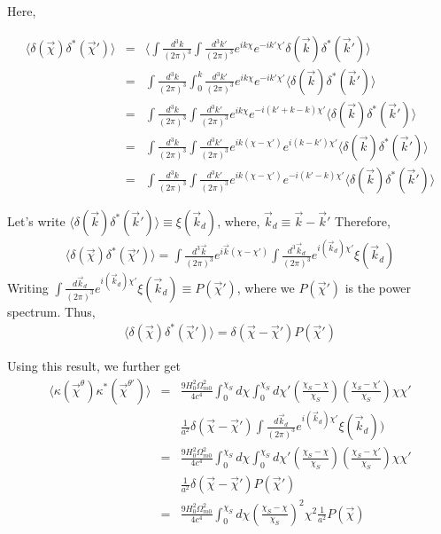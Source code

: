 \documentclass[12pt]{article}
\numberwithin{equation}{section}
\begin{document}
Here,

\begin{eqnarray}
\langle\delta(\vec{\chi}) \delta^*(\vec{\chi}') \rangle  
&=& \langle \int \frac{d^3k}{(2\pi)^3} \int \frac{d^3k'}{(2\pi)^3} e^{ik\chi} e^{-ik'\chi'} \delta(\vec{k}) \delta^*(\vec{k}') \rangle 
\\
&=&  \int \frac{d^3k}{(2\pi)^3} \int_0^{k} \frac{d^3k'}{(2\pi)^3} e^{ik\chi} e^{-ik'\chi'} \langle\delta(\vec{k}) \delta^*(\vec{k}') \rangle 
\\
&=& \int \frac{d^3k}{(2\pi)^3} \int \frac{d^3k'}{(2\pi)^3} e^{ik\chi} e^{-i(k' + k - k)\chi'} \langle\delta(\vec{k}) \delta^*(\vec{k}') \rangle 
\\
&= & \int \frac{d^3k}{(2\pi)^3} \int  \frac{d^3k'}{(2\pi)^3} e^{ik(\chi - \chi')} e^{i(k - k' )\chi'} \langle\delta(\vec{k}) \delta^*(\vec{k}') \rangle 
\\
&= & \int \frac{d^3k}{(2\pi)^3} \int  \frac{d^3k'}{(2\pi)^3} e^{ik(\chi - \chi')} e^{-i(k' - k )\chi'} \langle\delta(\vec{k}) \delta^*(\vec{k}') \rangle 
\end{eqnarray}

Let's write $\langle \delta(\vec{k}) \delta^*(\vec{k}') \rangle \equiv \xi(\vec{k}_d)$, where, $ \vec{k}_d \equiv \vec{k}-\vec{k}' $ 
Therefore,
\begin{eqnarray}
\langle\delta(\vec{\chi}) \delta^*(\vec{\chi}') \rangle = \int \frac{d^3\vec{k}}{(2\pi)^3}  e^{i\vec{k}(\chi - \chi')} \int \frac{d^3\vec{k}_d}{(2\pi)^3} e^{i(\vec{k}_d )\chi'} \xi(\vec{k}_d)
\end{eqnarray}
Writing $ \int \frac{d\vec{k}_d}{(2\pi)^3} e^{i(\vec{k}_d )\chi'} \xi(\vec{k}_d) \equiv P(\vec{\chi}') $, where we $ P(\vec{\chi}') $ is the power spectrum.
Thus,
\begin{eqnarray}
\langle\delta(\vec{\chi}) \delta^*(\vec{\chi}') \rangle =\delta(\vec{\chi} - \vec{\chi}') P(\vec{\chi}')
\end{eqnarray}

Using this result, we further get
\begin{eqnarray}
\langle \kappa(\vec{\chi}^\theta) \kappa^*(\vec{\chi}^{\theta'})\rangle 
&=& \frac{9 H_0^2 \Omega_{m0}^2}{4 c^4} \int_0^{\chi_S} d\chi \int_0^{\chi_S} d\chi'  \left(\frac{\chi_S - \chi}{\chi_S}\right) \left(\frac{\chi_S - \chi'}{\chi_S}\right) \chi \chi' \nonumber
\\ 
&&  \frac{1}{a^2} \delta(\vec{\chi} - \vec{\chi}') \int \frac{d\vec{k}_d}{(2\pi)^3} e^{i(\vec{k}_d )\chi'} \xi(\vec{k}_d))  
\\
&=& \frac{9 H_0^2 \Omega_{m0}^2}{4 c^4} \int_0^{\chi_S} d\chi \int_0^{\chi_S} d\chi'  \left(\frac{\chi_S - \chi}{\chi_S}\right) \left(\frac{\chi_S - \chi'}{\chi_S}\right) \chi \chi'  \nonumber
\\
&& \frac{1}{a^2} \delta(\vec{\chi} - \vec{\chi}') P(\vec{\chi}')
\\ 
&=&\frac{9 H_0^2 \Omega_{m0}^2}{4 c^4} \int_0^{\chi_S} d\chi   \left(\frac{\chi_S - \chi}{\chi_S}\right)^2  \chi^2 \frac{1}{a^2} P(\vec{\chi})
\end{eqnarray}
\end{document}
